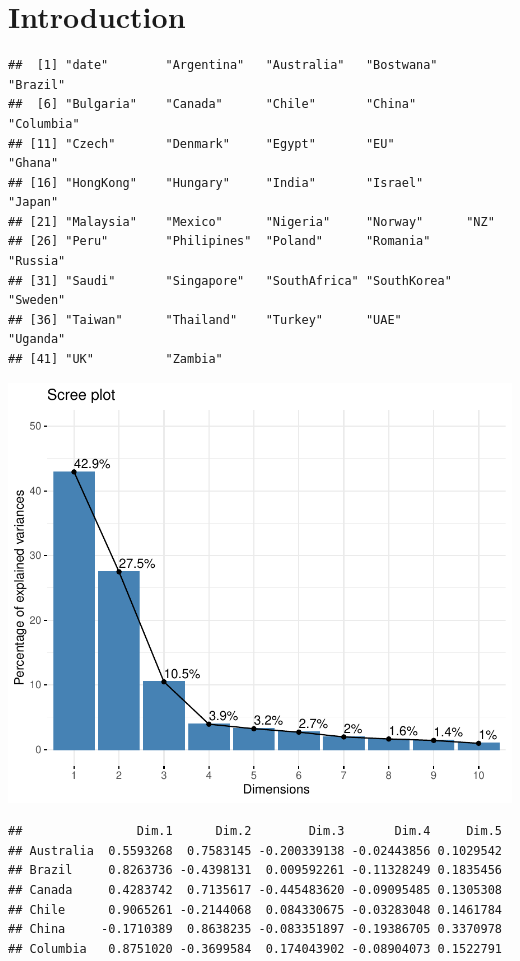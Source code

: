 \documentclass[11pt,preprint, authoryear]{elsarticle}
\numberwithin{equation}{section}
\numberwithin{figure}{section}
\numberwithin{table}{section}
\begin{document}
\hypertarget{introduction}{%
\section{\texorpdfstring{Introduction
\label{Introduction}}{Introduction }}\label{introduction}}

\begin{verbatim}
##  [1] "date"        "Argentina"   "Australia"   "Bostwana"    "Brazil"     
##  [6] "Bulgaria"    "Canada"      "Chile"       "China"       "Columbia"   
## [11] "Czech"       "Denmark"     "Egypt"       "EU"          "Ghana"      
## [16] "HongKong"    "Hungary"     "India"       "Israel"      "Japan"      
## [21] "Malaysia"    "Mexico"      "Nigeria"     "Norway"      "NZ"         
## [26] "Peru"        "Philipines"  "Poland"      "Romania"     "Russia"     
## [31] "Saudi"       "Singapore"   "SouthAfrica" "SouthKorea"  "Sweden"     
## [36] "Taiwan"      "Thailand"    "Turkey"      "UAE"         "Uganda"     
## [41] "UK"          "Zambia"
\end{verbatim}

\includegraphics{Essay_files/figure-latex/unnamed-chunk-2-1.pdf}

\begin{verbatim}
##                Dim.1      Dim.2        Dim.3       Dim.4     Dim.5
## Australia  0.5593268  0.7583145 -0.200339138 -0.02443856 0.1029542
## Brazil     0.8263736 -0.4398131  0.009592261 -0.11328249 0.1835456
## Canada     0.4283742  0.7135617 -0.445483620 -0.09095485 0.1305308
## Chile      0.9065261 -0.2144068  0.084330675 -0.03283048 0.1461784
## China     -0.1710389  0.8638235 -0.083351897 -0.19386705 0.3370978
## Columbia   0.8751020 -0.3699584  0.174043902 -0.08904073 0.1522791
\end{verbatim}
\end{document}
